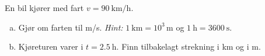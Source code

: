 %
En bil kjører med fart $v = \SI{90}{\kilo\metre\per\hour}$.
\begin{enumerate}[a)]
    \item Gjør om farten til m/s. \textit{Hint: } $\SI{1}{\kilo\metre} = 10^3\,\si{\metre}$ og $\SI{1}{\hour} = \SI{3600}{\second}$.
    \item Kjøreturen varer i $t = \SI{2.5}{\hour}$. Finn tilbakelagt strekning i km og i m.
\end{enumerate}
